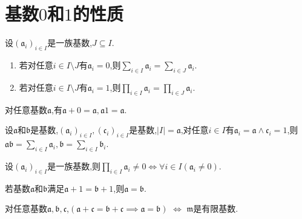 \section{基数\texorpdfstring{$0$}{0}和\texorpdfstring{$1$}{1}的性质}

\begin{proposition}{}{}
	设$\left(\mathfrak{a}_{i}\right)_{i\in I}$是一族基数,$J\subseteq I$.
	\begin{enumerate}
		\item 若对任意$i\in I\setminus J$有$\mathfrak{a}_{i}=0$,则$\sum\limits_{i\in I}\mathfrak{a}_{i}=\sum\limits_{i\in J}\mathfrak{a}_{i}$.
		\item 若对任意$i\in I\setminus J$有$\mathfrak{a}_{i}=1$,则$\prod\limits_{i\in I}\mathfrak{a}_{i}=\prod\limits_{i\in J}\mathfrak{a}_{i}$.
	\end{enumerate}
\end{proposition}

\begin{corollary}{}{}
	对任意基数$\mathfrak{a}$,有$\mathfrak{a}+0=\mathfrak{a},\mathfrak{a}1=\mathfrak{a}$.
\end{corollary}

\begin{corollary}{}{}
	设$\mathfrak{a}$和$\mathfrak{b}$是基数,$\left(\mathfrak{a}_{i}\right)_{i\in I},\left(\mathfrak{c}_{i}\right)_{i\in I}$是基数,$\left|I\right|=\mathfrak{a}$,对任意$i\in I$有$\mathfrak{a}_{i}=\mathfrak{a}\wedge\mathfrak{c}_{i}=1$,则$\mathfrak{a}\mathfrak{b}=\sum\limits_{i\in I}\mathfrak{a}_{i},\mathfrak{b}=\sum\limits_{i\in I}\mathfrak{b}_{i}$.
\end{corollary}

\begin{proposition}{}{}
	设$\left(\mathfrak{a}_{i}\right)_{i\in I}$是一族基数,则$\prod\limits_{i\in I}\mathfrak{a}_{i}\neq 0\iff \forall i\in I\left(\mathfrak{a}_{i}\neq 0\right)$.
\end{proposition}

\begin{proposition}{}{}
	若基数$\mathfrak{a}$和$\mathfrak{b}$满足$\mathfrak{a}+1=\mathfrak{b}+1$,则$\mathfrak{a}=\mathfrak{b}$.
\end{proposition}

\begin{remark}{}{}
	对任意基数$\mathfrak{a},\mathfrak{b},\mathfrak{c}$,$\left(\mathfrak{a}+\mathfrak{c}=\mathfrak{b}+\mathfrak{c}\implies\mathfrak{a}=\mathfrak{b}\right)$ $\iff$ $\mathfrak{m}$是有限基数.
\end{remark}

























